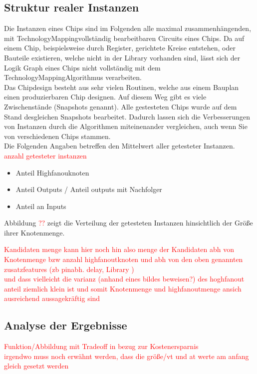 \documentclass[11pt, a4paper, german]{article}
\newcommand{\TM}{TechnologyMapping}
\begin{document}
 \subsection{Struktur realer Instanzen}
\label{subsec:struktur_realer_instanzen} 
 Die Instanzen eines Chips sind im Folgenden alle maximal zusammenhängenden, mit \TM vollständig bearbeitbaren Circuits eines Chips. Da auf einem Chip, beispielsweise durch Register, gerichtete Kreise entstehen, oder Bauteile existieren, welche nicht in der Library vorhanden sind, lässt sich der Logik Graph eines Chips nicht vollständig mit dem \TM Algorithmus verarbeiten. \\
 Das Chipdesign besteht aus sehr vielen Routinen, welche aus einem Bauplan einen produzierbaren Chip designen. Auf diesem Weg gibt es viele Zwischenstände (Snapshots genannt). Alle gestesteten Chips wurde auf dem Stand  desgleichen Snapshots bearbeitet. Dadurch lassen sich die Verbesserungen von Instanzen durch die Algorithmen miteinenander vergleichen, auch wenn Sie von verschiedenen Chips stammen.\\
 Die Folgenden Angaben betreffen den Mittelwert aller getesteter Instanzen. \\
 \textcolor{red}{anzahl getesteter instanzen}
 \begin{itemize}
 	\item Anteil Highfanouknoten 
 	\item Anteil Outputs / Anteil outputs mit Nachfolger
 	\item Anteil an Inputs
 \end{itemize}
 Abbildung \textcolor{red}{??} zeigt die Verteilung der getesteten Instanzen hinsichtlich der Größe  ihrer Knotenmenge.
 
\textcolor{red}{ Kandidaten menge kann hier noch hin also menge der Kandidaten abh von Knotenmenge bzw anzahl highfanoutknoten  und abh von den oben genannten zusatzfeatures (zb pinabh. delay, Library )  \\  und dass vielleicht die varianz (anhand eines bildes beweisen?) des hoghfanout anteil ziemlich klein ist und somit Knotenmenge und highfanoutmenge ansich ausreichend aussagekräftig sind} 
 
 \subsection{Analyse der Ergebnisse}
 \label{subsec:analyse_der_ergebnisse}
\textcolor{red}{Funktion/Abbildung mit Tradeoff in bezug zur Kostenersparnis \\ irgendwo muss noch erwähnt werden, dass die größe/vt und at werte am anfang gleich gesetzt werden }
 
\end{document}
